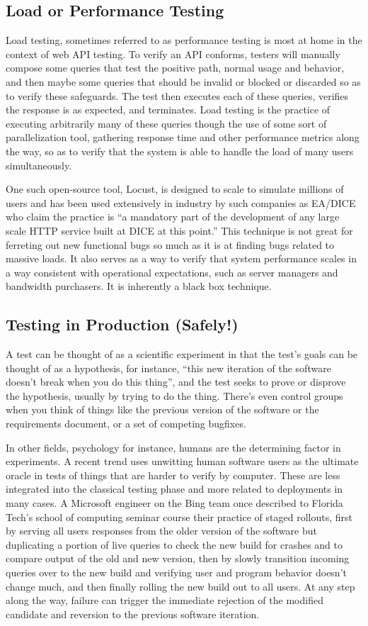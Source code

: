 \subsection{Load or Performance Testing}
Load testing, sometimes referred to as performance testing is most at home in the context of web API testing. To verify an API conforms, testers will manually compose some queries that test the positive path, normal usage and behavior, and then maybe some queries that should be invalid or blocked or discarded so as to verify these safeguards. The test then executes each of these queries, verifies the response is as expected, and terminates. Load testing is the practice of executing arbitrarily many of these queries though the use of some sort of parallelization tool, gathering response time and other performance metrics along the way, so as to verify that the system is able to handle the load of many users simultaneously.

One such open-source tool, Locust\citep{heymanlocust}, is designed to scale to simulate millions of users and has been used extensively in industry by such companies as EA/DICE who claim the practice is ``a mandatory part of the development of any large scale HTTP service built at DICE at this point.'' This technique is not great for ferreting out new functional bugs so much as it is at finding bugs related to massive loads. It also serves as a way to verify that system performance scales in a way consistent with operational expectations, such as server managers and bandwidth purchasers. It is inherently a black box technique.

\subsection{Testing in Production (Safely!)}
A test can be thought of as a scientific experiment in that the test's goals can be thought of as a hypothesis, for instance, ``this new iteration of the software doesn't break when you do this thing'', and the test seeks to prove or disprove the hypothesis, usually by trying to do the thing. There's even control groups when you think of things like the previous version of the software or the requirements document, or a set of competing bugfixes.

In other fields, psychology for instance, humans are the determining factor in experiments. A recent trend uses unwitting human software users as the ultimate oracle in tests of things that are harder to verify by computer. These are less integrated into the classical testing phase and more related to deployments in many cases. A Microsoft engineer on the Bing team once described to Florida Tech's school of computing seminar course their practice of staged rollouts, first by serving all users responses from the older version of the software but duplicating a portion of live queries to check the new build for crashes and to compare output of the old and new version, then by slowly transition incoming queries over to the new build and verifying user and program behavior doesn't change much, and then finally rolling the new build out to all users. At any step along the way, failure can trigger the immediate rejection of the modified candidate and reversion to the previous software iteration.

